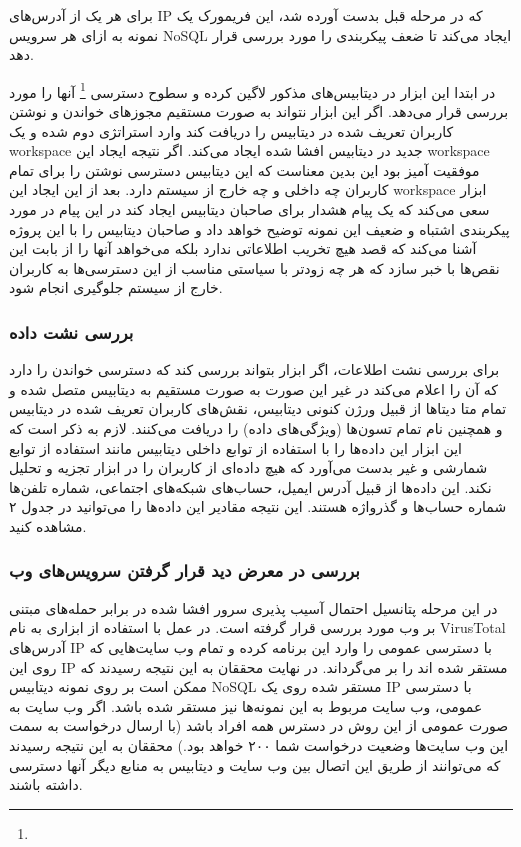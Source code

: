 \documentclass[10pt, a4paper]{article}
\begin{document}
برای هر یک از آدرس‌های IP که در مرحله قبل بدست آورده شد، این فریمورک یک نمونه به
ازای هر سرویس NoSQL ایجاد می‌کند تا ضعف پیکربندی را مورد بررسی قرار دهد.

در ابتدا این ابزار در دیتابیس‌های مذکور لاگین کرده و سطوح دسترسی
\footnote{} آنها را مورد بررسی قرار می‌دهد. اگر این ابزار
نتواند به صورت مستقیم مجوز‌های خواندن و نوشتن کاربران تعریف شده در دیتابیس را
دریافت کند وارد استراتژی دوم شده و یک workspace جدید در دیتابیس افشا شده ایجاد
می‌کند. اگر نتیجه ایجاد این workspace موفقیت آمیز بود این بدین معناست که این
دیتابیس دسترسی نوشتن را برای تمام کاربران چه داخلی و چه خارج از سیستم دارد. بعد
از این ایجاد این workspace ابزار سعی می‌کند که یک پیام هشدار برای صاحبان دیتابیس
ایجاد کند در این پیام در مورد پیکربندی اشتباه و ضعیف این نمونه توضیح خواهد داد و
صاحبان دیتابیس را با این پروژه آشنا می‌کند که قصد هیچ تخریب اطلاعاتی ندارد بلکه
می‌خواهد آنها را از بابت این نقص‌ها با خبر سازد که هر چه زودتر با سیاستی مناسب
از این دسترسی‌ها به کاربران خارج از سیستم جلوگیری انجام شود.

\subsubsection*{بررسی نشت داده}

برای بررسی نشت اطلاعات، اگر ابزار بتواند بررسی کند که دسترسی خواندن را دارد که
آن را اعلام می‌کند در غیر این صورت به صورت مستقیم به دیتابیس متصل شده و تمام متا
دیتا‌ها از قبیل ورژن کنونی دیتابیس، نقش‌های کاربران تعریف شده در دیتابیس و
همچنین نام تمام تسون‌ها (ویژگی‌های داده) را دریافت می‌کنند. لازم به ذکر است که
این ابزار این داده‌ها را با استفاده از توابع داخلی دیتابیس مانند استفاده از
 توابع شمارشی و غیر بدست می‌آورد که هیچ داده‌ای از کاربران
را در ابزار تجزیه و تحلیل نکند. این داده‌ها از قبیل آدرس ایمیل، حساب‌های
شبکه‌های اجتماعی، شماره تلفن‌ها شماره حساب‌ها و گذرواژه هستند. این نتیجه مقادیر
این داده‌ها را می‌توانید در جدول ۲ مشاهده کنید.

\subsubsection*{بررسی در معرض دید قرار گرفتن سرویس‌های وب}

در این مرحله پتانسیل احتمال آسیب پذیری سرور افشا شده در برابر حمله‌های مبتنی بر
وب مورد بررسی قرار گرفته است. در عمل با استفاده از ابزاری به نام VirusTotal
آدرس‌های IP با دسترسی عمومی را وارد این برنامه کرده و تمام وب سایت‌هایی که روی
این IP مستقر شده اند را بر می‌گرداند. در نهایت محققان به این نتیجه رسیدند که
ممکن است بر روی نمونه دیتابیس NoSQL مستقر شده روی یک IP با دسترسی عمومی، وب
سایت‌ مربوط به این نمونه‌ها نیز مستقر شده باشد. اگر وب سایت به صورت عمومی از این
روش در دسترس همه افراد باشد (با ارسال درخواست به سمت این وب سایت‌ها وضعیت
درخواست شما ۲۰۰ خواهد بود.) محققان به این نتیجه رسیدند که می‌توانند از طریق این
اتصال بین وب سایت و دیتابیس به منابع دیگر آنها دسترسی داشته باشند.
\end{document}
